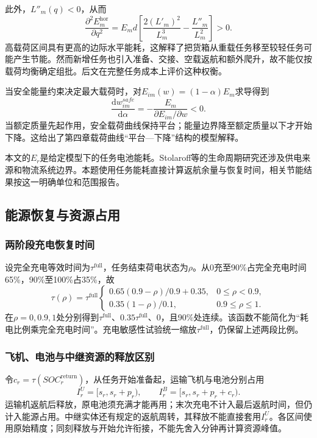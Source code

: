 \documentclass[withoutpreface,colorprint]{format}
\numberwithin{equation}{section}
\numberwithin{figure}{section}
\numberwithin{table}{section}
\begin{document}
此外，$L''_m(q)<0$，从而
\begin{equation}
\frac{\partial^2 E_m^{\mathrm{hor}}}{\partial q^2}
=E_md\left[\frac{2(L'_m)^2}{L_m^3}-\frac{L''_m}{L_m^2}\right]>0.
\label{eq:energy_load_convexity}
\end{equation}
高载荷区间具有更高的边际水平能耗，这解释了把货箱从重载任务移至较轻任务可能产生节能。然而新增任务也引入准备、交接、空载返航和额外爬升，故不能仅按载荷均衡确定组批。后文在完整任务成本上评价这种权衡。

当安全能量约束决定最大载荷时，对$E_{im}(w)=(1-\alpha)E_m$求导得到
\begin{equation}
\frac{\mathrm d w_{im}^{safe}}{\mathrm d\alpha}
=-\frac{E_m}{\partial E_{im}/\partial w}<0.
\label{eq:payload_alpha_derivative}
\end{equation}
当额定质量先起作用，安全载荷曲线保持平台；能量边界降至额定质量以下才开始下降。这给出了第四章载荷曲线“平台—下降”结构的模型解释。

本文的$E_r$是给定模型下的任务电池能耗。Stolaroff等的生命周期研究还涉及供电来源和物流系统边界\cite{stolaroff2018,stolaroff2018corr}。本题使用任务能耗直接计算返航余量与恢复时间，相关节能结果按这一明确单位和范围报告。


\subsection{能源恢复与资源占用}
\subsubsection{两阶段充电恢复时间}
设完全充电等效时间为$\tau^{\mathrm{full}}$，任务结束荷电状态为$\rho$。从0充至90\%占完全充电时间65\%，90\%至100\%占35\%，故
\begin{equation}
 \tau(\rho)=\tau^{\mathrm{full}}\begin{cases}
 0.65(0.9-\rho)/0.9+0.35,&0\le\rho<0.9,\\
 0.35(1-\rho)/0.1,&0.9\le\rho\le1.
 \end{cases}
\label{eq:common_recharge}
\end{equation}
在$\rho=0,0.9,1$处分别得到$\tau^{\mathrm{full}}$、$0.35\tau^{\mathrm{full}}$、0，且90\%处连续。该函数不能简化为“耗电比例乘完全充电时间”。充电敏感性试验统一缩放$\tau^{\mathrm{full}}$，仍保留上述两段比例。

\subsubsection{飞机、电池与中继资源的释放区别}
令$c_r=\tau(SOC_r^{\mathrm{return}})$，从任务开始准备起，运输飞机与电池分别占用
\begin{equation}
 I_r^U=[s_r,s_r+p_r),\qquad I_r^B=[s_r,s_r+p_r+c_r).
\label{eq:common_occupancy}
\end{equation}
运输机返航后释放，原电池须充满才能再用；末次充电不计入最后返航时间，但仍计入能源占用。中继实体还有规定的返航周转，其释放不能直接套用$I_r^U$。各区间使用原始精度；同刻释放与开始允许衔接，不能先舍入分钟再计算资源峰值。
\end{document}

